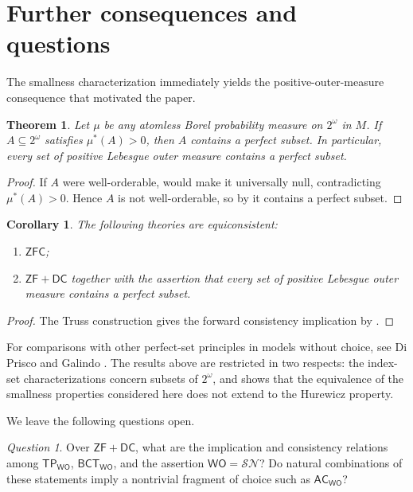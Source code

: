 \documentclass[11pt,reqno]{amsart}
\newcommand{\WO}{\mathsf{WO}}
\newcommand{\SN}{\mathcal{SN}}
\newcommand{\BCTWO}{\mathsf{BCT}_{\WO}}
\newcommand{\TP}{\mathsf{TP}_{\WO}}
\theoremstyle{plain}
\newtheorem{theorem}{Theorem}[section]
\newtheorem{corollary}[corollary]{Corollary}
\theoremstyle{definition}
\theoremstyle{remark}
\newtheorem{question}[question]{Question}
\begin{document}
\section{Further consequences and questions}\label{sec:conclusion}

The smallness characterization immediately yields the positive-outer-measure consequence that motivated the paper.

\begin{theorem}\label{thm:positive-measure}
Let $\mu$ be any atomless Borel probability measure on $2^\omega$ in $M$.
If $A\subseteq2^\omega$ satisfies $\mu^*(A)>0$, then $A$ contains a perfect subset.
In particular, every set of positive Lebesgue outer measure contains a perfect subset.
\end{theorem}

\begin{proof}
If $A$ were well-orderable,  would make it universally null, contradicting $\mu^*(A)>0$.
Hence $A$ is not well-orderable, so by  it contains a perfect subset.
\end{proof}

\begin{corollary}\label{cor:equiconsistency}
The following theories are equiconsistent:
\begin{enumerate}
\item $\mathsf{ZFC}$;
\item $\mathsf{ZF}+\mathsf{DC}$ together with the assertion that every set of positive Lebesgue outer measure contains a perfect subset.
\end{enumerate}
\end{corollary}

\begin{proof}
The Truss construction gives the forward consistency implication by .
\end{proof}

For comparisons with other perfect-set principles in models without choice, see Di Prisco and Galindo \cite{DiPriscoGalindo2010}.
The results above are restricted in two respects: the index-set characterizations concern subsets of $2^\omega$, and  shows that the equivalence of the smallness properties considered here does not extend to the Hurewicz property.

We leave the following questions open.

\begin{question}
Over $\mathsf{ZF}+\mathsf{DC}$, what are the implication and consistency relations among $\TP$, $\BCTWO$, and the assertion $\WO=\SN$?
Do natural combinations of these statements imply a nontrivial fragment of choice such as $\mathsf{AC}_{\WO}$?
\end{question}
\end{document}
